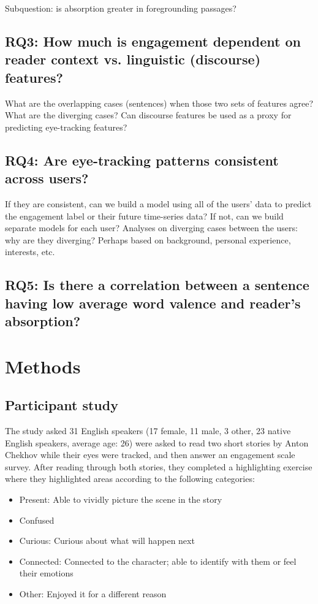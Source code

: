 \documentclass[11pt]{article}
\begin{document}
Subquestion: is absorption greater in foregrounding passages?

\subsection{RQ3: How much is engagement dependent on reader context vs. linguistic (discourse) features?}

What are the overlapping cases (sentences) when those two sets of features agree? What are the diverging cases? Can discourse features be used as a proxy for predicting eye-tracking features?

\subsection{RQ4: Are eye-tracking patterns consistent across users?}

If they are consistent, can we build a model using all of the users’ data to predict the engagement label or their future time-series data? If not, can we build separate models for each user? Analyses on diverging cases between the users: why are they diverging? Perhaps based on background, personal experience, interests, etc.

\subsection{RQ5: Is there a correlation between a sentence having low average word valence and reader’s absorption?}

\section{Methods}

\subsection{Participant study}

The study asked 31 English speakers (17 female, 11 male, 3 other, 23 native English speakers, average age: 26) were asked to read two short stories by Anton Chekhov while their eyes were tracked, and then answer an engagement scale survey. After reading through both stories, they completed a highlighting exercise where they highlighted areas according to the following categories:

\begin{itemize}
  \item Present: Able to vividly picture the scene in the story
  \item Confused
  \item Curious: Curious about what will happen next
  \item Connected: Connected to the character; able to identify with them or feel their emotions
  \item Other: Enjoyed it for a different reason
\end{itemize}
\end{document}
